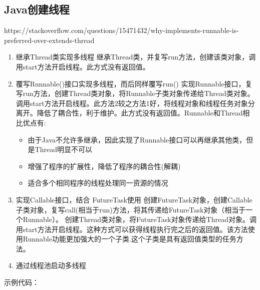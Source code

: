 \documentclass[../../../interview-questions.tex]{subfiles}
\begin{document}
\subsection{Java创建线程}

https://stackoverflow.com/questions/15471432/why-implements-runnable-is-preferred-over-extends-thread

\begin{enumerate}
    \item{继承Thread类实现多线程} 继承Thread类，并复写run方法，创建该类对象，调用start方法开启线程。此方式没有返回值。
    \item{覆写Runnable()接口实现多线程，而后同样覆写run()} 实现Runnable接口，复写run方法，创建Thread类对象，将Runnable子类对象传递给Thread类对象。调用start方法开启线程。此方法2较之方法1好，将线程对象和线程任务对象分离开。降低了耦合性，利于维护。此方式没有返回值。Runnable和Thread相比优点有:
    
    \begin{itemize}
        \item {由于Java不允许多继承，因此实现了Runnable接口可以再继承其他类，但是Thread明显不可以}
        \item {增强了程序的扩展性，降低了程序的耦合性(解耦)}
        \item {适合多个相同程序的线程处理同一资源的情况}
    \end{itemize}

    \item{实现Callable接口，结合 FutureTask使用} 创建FutureTask对象，创建Callable子类对象，复写call(相当于run)方法，将其传递给FutureTask对象（相当于一个Runnable）。 创建Thread类对象，将FutureTask对象传递给Thread对象。调用start方法开启线程。这种方式可以获得线程执行完之后的返回值。该方法使用Runnable功能更加强大的一个子类.这个子类是具有返回值类型的任务方法。
    \item {通过线程池启动多线程}
\end{enumerate}

示例代码：
\end{document}
